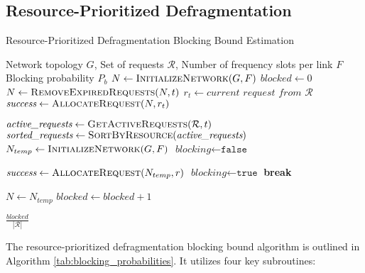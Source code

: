 \subsection*{Resource-Prioritized Defragmentation}
\label{sec:bounds}


\begin{algorithm}
\caption{Resource-Prioritized Defragmentation Blocking Bound Estimation}
\begin{algorithmic}[1]
\Require Network topology $G$, Set of requests $\mathcal{R}$, Number of frequency slots per link $F$
\Ensure Blocking probability $P_b$
\State $N \gets \textsc{InitializeNetwork}(G, F)$ 
\State $\textit{blocked} \gets 0$
    \State $N \gets \textsc{RemoveExpiredRequests}(N, t)$
    \State $r_t \gets \textit{current request from } \mathcal{R}$
    \State $\textit{success} \gets \textsc{AllocateRequest}(N, r_t)$
    
        \State $\textit{active\_requests} \gets \textsc{GetActiveRequests}(\mathcal{R}, t)$
        \State $\textit{sorted\_requests} \gets \textsc{SortByResource}(\textit{active\_requests})$
        \State $N_{temp} \gets \textsc{InitializeNetwork}(G, F)$
        \State $\textit{blocking} \gets \texttt{false}$
        
            \State $\textit{success} \gets \textsc{AllocateRequest}(N_{temp}, r)$
                \State $\textit{blocking} \gets \texttt{true}$
                \State \textbf{break}
            \EndIf
        \EndFor
        
            \State $N \gets N_{temp}$
        \Else
            \State $\textit{blocked} \gets \textit{blocked} + 1$
        \EndIf
    \EndIf
\EndFor

\State \Return $\frac{\textit{blocked}}{|\mathcal{R}|}$
\end{algorithmic}
\label{algo:defrag}
\end{algorithm}

The resource-prioritized defragmentation blocking bound algorithm is outlined in Algorithm \ref{tab:blocking_probabilities}. It utilizes four key subroutines:

